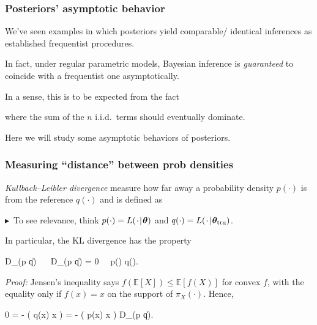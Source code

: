 \documentclass[18pt]{beamer}
\newcommand{\defineTightItemizeSpacing}{%
	\setlength{\abovedisplayskip}{.25\baselineskip}%
	\setlength{\belowdisplayskip}{.25\baselineskip}%
}
\newenvironment{tightEquation*}{%
	\defineTightItemizeSpacing%
	\begin{equation*}
}{
	\end{equation*} \ignorespacesafterend
}
\newcommand{\noteBullet}{\hspace*{.75em}\textcolor{themecolor}{$\blacktriangleright$}\ }
\newcommand{\given}{\thinnerspace | \thinnerspace}
\newcommand{\defeq}{\vcentcolon =} %
\newcommand{\diff}{\operatorname{\mathrm{d}}\!{}}
\newcommand{\thinnerspace}{\mskip.5\thinmuskip}
\newcommand{\thinnestspace}{\mskip.25\thinmuskip}
\newcommand{\expectation}{\mathbb{E}}
\newcommand{\kldivergence}{D_{\mathrm{KL}}}
\newcommand{\truthSub}{\mathrm{tru}}
\newcommand{\density}{\pi}
\newcommand{\likelihood}{L}
\newcommand{\by}{\bm{y}}
\newcommand{\btheta}{\bm{\theta}}
\begin{document}
\begin{frame}
\frametitle{Posteriors' asymptotic behavior}
We've seen examples in which posteriors yield comparable/ identical inferences as established frequentist procedures.

\pause
In fact, under regular parametric models, Bayesian inference is \textit{guaranteed} to coincide with a frequentist one asymptotically.

\pause
In a sense, this is to be expected from the fact 
where the sum of the $n$ i.i.d.\ terms should eventually dominate.

\pause
Here we will study some asymptotic behaviors of posteriors.
\end{frame}


\begin{frame}
\frametitle{Measuring ``distance'' between prob densities}
\textit{Kullback–Leibler divergence} measure how far away a probability density $p(\cdot)$ is from the reference $q(\cdot)$ and is defined as
\pause%
\noteBullet To see relevance, think $p(\cdot) = \likelihood(\thinnerspace \cdot \given \btheta)$ and $q(\cdot) = \likelihood(\thinnerspace \cdot \given \btheta_\truthSub)$.

\pause
\smallskip
In particular, the KL divergence has the property 
\begin{tightEquation*}
\kldivergence(p \| q) 
	\  \
	\kldivergence(p \| q) = 0 \,  \, p(\cdot) \equiv q(\cdot).
\end{tightEquation*}

\pause
\textit{Proof:} 
Jensen's inequality says $f(\expectation[X]) \leq \expectation[f(X)]$ for convex $f$, with the equality only if $f(x) = x$ on the support of $\density_X(\cdot)$. Hence,
\begin{tightEquation*}
0 = - \log\!\left( \int q(x) \diff x \right) \pause
	= - \log\!\left( \int {} p(x) \diff x \right) \pause
	\leq \kldivergence(p \| q).
\end{tightEquation*}
\end{frame}
\end{document}
